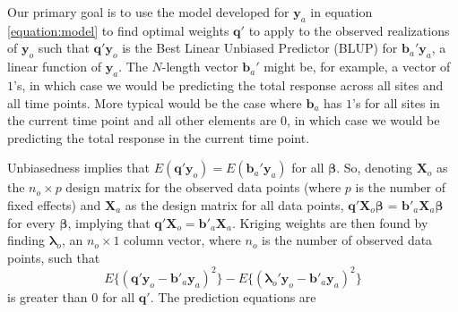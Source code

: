 \documentclass[]{article}    %
\begin{document}
Our primary goal is to use the model developed for \(\mathbf{y}_a\) in
equation \ref{equation:model} to find optimal weights \(\mathbf{q}'\) to
apply to the observed realizations of \(\mathbf{y}_o\) such that
\(\mathbf{q}' \mathbf{y}_o\) is the Best Linear Unbiased Predictor
(BLUP) for \(\mathbf{b}_a' \mathbf{y}_a\), a linear function of
\(\mathbf{y}_a\). The \(N\)-length vector \(\mathbf{b}_a'\) might be,
for example, a vector of \(1\)'s, in which case we would be predicting
the total response across all sites and all time points. More typical
would be the case where \(\mathbf{b}_a\) has \(1\)'s for all sites in
the current time point and all other elements are \(0\), in which case
we would be predicting the total response in the current time point.

Unbiasedness implies that
\(E(\mathbf{q'}\mathbf{y}_o) = E(\mathbf{b}_a'\mathbf{y}_a)\) for all
\(\bm{\beta}\). So, denoting \(\mathbf{X}_o\) as the \(n_o \times p\)
design matrix for the observed data points (where \(p\) is the number of
fixed effects) and \(\mathbf{X}_a\) as the design matrix for all data
points, \(\mathbf{q'} \mathbf{X}_o \bm{\beta}\) =
\(\mathbf{b'}_a \mathbf{X}_a \bm{\beta}\) for every \(\bm{\beta}\),
implying that \(\mathbf{q'} \mathbf{X}_o = \mathbf{b'}_a \mathbf{X}_a\).
Kriging weights are then found by finding \(\bm{\lambda}_o\), an
\(n_o \times 1\) column vector, where \(n_o\) is the number of observed
data points, such that \mbox{} \begin{equation}
E\{(\mathbf{q'}\mathbf{y}_o - \mathbf{b'}_a \mathbf{y}_a)^2\} - E\{(\bm{\lambda}_o'\mathbf{y}_o - \mathbf{b'}_a \mathbf{y}_a)^2\}
\end{equation} \noindent is greater than 0 for all \(\mathbf{q'}\). The
prediction equations are
\end{document}
